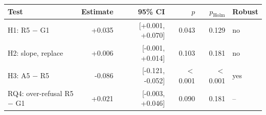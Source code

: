 \begin{tabular}{lrrrrl}
\toprule
Test & Estimate & 95\% CI & $p$ & $p_{\mathrm{Holm}}$ & Robust \\
\midrule
H1: R5 $-$ G1 & +0.035 & [+0.001, +0.070] & 0.043 & 0.129 & no \\
H2: slope, replace & +0.006 & [-0.001, +0.014] & 0.103 & 0.181 & no \\
H3: A5 $-$ R5 & -0.086 & [-0.121, -0.052] & $<$0.001 & $<$0.001 & yes \\
RQ4: over-refusal R5 $-$ G1 & +0.021 & [-0.003, +0.046] & 0.090 & 0.181 & -- \\
\bottomrule
\end{tabular}
